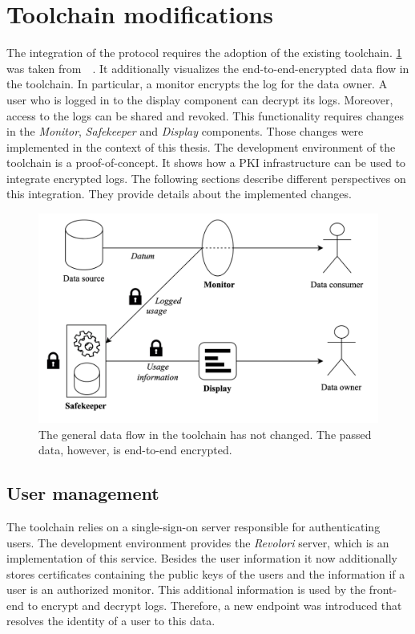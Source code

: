 \documentclass[../main.tex]{subfiles}
\begin{document}
\section{Toolchain modifications}
\label{sec:toolchain-modifications}
The integration of the protocol requires the adoption of the existing toolchain.
\cref{fig:encrypted-toolchain} was taken from~\citeauthor{Zieglmeier2021}~\cite{Zieglmeier2021}.
It additionally visualizes the end-to-end-encrypted data flow in the toolchain.
In particular, a monitor encrypts the log for the data owner.
A user who is logged in to the display component can decrypt its logs.
Moreover, access to the logs can be shared and revoked.
This functionality requires changes in the \emph{Monitor}, \emph{Safekeeper} and \emph{Display} components.
Those changes were implemented in the context of this thesis.
The development environment of the toolchain is a proof-of-concept.
It shows how a PKI infrastructure can be used to integrate encrypted logs.
The following sections describe different perspectives on this integration.
They provide details about the implemented changes.


\begin{figure}[h!]
    \includegraphics[scale=0.16]{../img/06/encrypted_toolchain.png}
    \centering
    \caption[Toolchain encrypted data flow]{The general data flow in the toolchain has not changed. The passed data, however, is end-to-end encrypted.}
    \label{fig:encrypted-toolchain}
\end{figure}

\subsection{User management}
The toolchain relies on a single-sign-on server responsible for authenticating users.
The development environment provides the \emph{Revolori} server, which is an implementation of this service.
Besides the user information it now additionally stores certificates containing the public keys of the users and the information if a user is an authorized monitor.
This additional information is used by the front-end to encrypt and decrypt logs.
Therefore, a new endpoint was introduced that resolves the identity of a user to this data.
\end{document}
